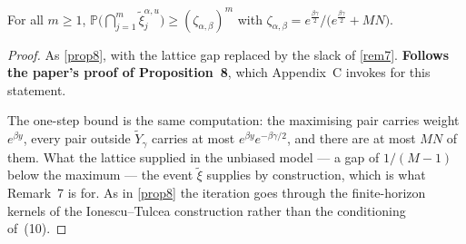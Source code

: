 \begin{proposition}
  \label{prop24}
  \leanok
  For all $m \ge 1$,
  $\mathbb{P}\bigl( \bigcap_{j=1}^{m} \tilde{\xi}_j^{\alpha,u} \bigr)
   \ge (\zeta_{\alpha,\beta})^m$ with
  $\zeta_{\alpha,\beta} = e^{\frac{\beta\gamma}{2}} /
   \bigl( e^{\frac{\beta\gamma}{2}} + MN \bigr)$.
\end{proposition}
\begin{proof}
  \leanok
  As \ref{prop8}, with the lattice gap replaced by the slack of \ref{rem7}.
  \textbf{Follows the paper's proof of Proposition~8}, which Appendix~C invokes
  for this statement.

  The one-step bound is the same computation: the maximising pair carries
  weight $e^{\beta y}$, every pair outside $\tilde{Y}_\gamma$ carries at most
  $e^{\beta y} e^{-\beta\gamma/2}$, and there are at most $MN$ of them.  What
  the lattice supplied in the unbiased model --- a gap of $1/(M-1)$ below the
  maximum --- the event $\tilde{\xi}$ supplies by construction, which is what
  Remark~7 is for.  As in \ref{prop8} the iteration goes through the
  finite-horizon kernels of the Ionescu--Tulcea construction rather than the
  conditioning of~(10).
\end{proof}

